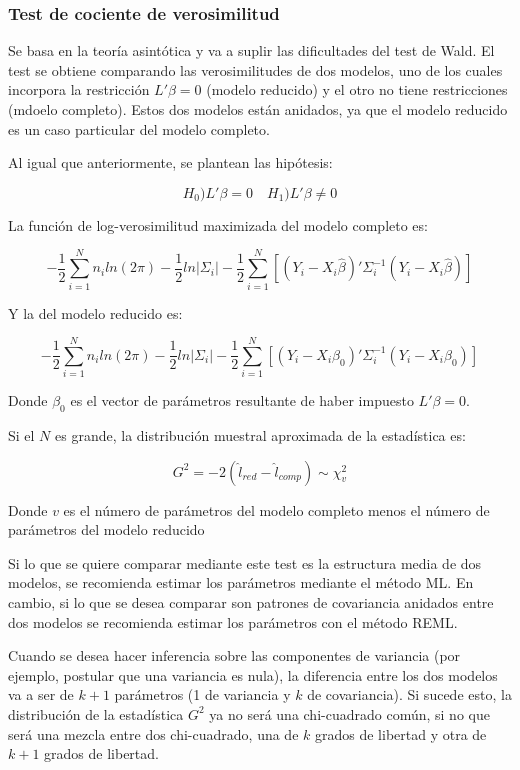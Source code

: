 \documentclass[12pt]{article}
\begin{document}
\subsubsection{Test de cociente de verosimilitud}

Se basa en la teoría asintótica y va a suplir las dificultades del test de Wald. El test se obtiene comparando las
verosimilitudes de dos modelos, uno de los cuales incorpora la restricción $L'\beta = 0$ (modelo reducido) y el otro no
tiene restricciones (mdoelo completo). Estos dos modelos están anidados, ya que el modelo reducido es un caso particular
del modelo completo.

Al igual que anteriormente, se plantean las hipótesis:

\[ H_0) L'\beta = 0 \quad H_1) L'\beta \neq 0 \]

La función de log-verosimilitud maximizada del modelo completo es:

\[ -\frac{1}{2} \sum_{i=1}^{N}n_i ln(2\pi) - \frac{1}{2}ln|\varSigma_i| -
\frac{1}{2} \sum_{i=1}^{N} [(Y_i - X_i\hat{\beta})' \varSigma_i^{-1} (Y_i - X_i\hat{\beta})] \]

Y la del modelo reducido es:

\[ -\frac{1}{2} \sum_{i=1}^{N}n_i ln(2\pi) - \frac{1}{2}ln|\varSigma_i| -
\frac{1}{2} \sum_{i=1}^{N} [(Y_i - X_i\beta_0)' \varSigma_i^{-1} (Y_i - X_i\beta_0)] \]

Donde $\beta_0$ es el vector de parámetros resultante de haber impuesto $L'\beta = 0$.

Si el $N$ es grande, la distribución muestral aproximada de la estadística es:

\[ G^2 = -2 (\hat{l}_{red} - \hat{l}_{comp}) \sim \chi_v^2 \]

Donde $v$ es el número de parámetros del modelo completo menos el número de parámetros del modelo reducido

Si lo que se quiere comparar mediante este test es la estructura media de dos modelos, se recomienda estimar los parámetros
mediante el método ML. En cambio, si lo que se desea comparar son patrones de covariancia anidados entre dos modelos se
recomienda estimar los parámetros con el método REML.

Cuando se desea hacer inferencia sobre las componentes de variancia (por ejemplo, postular que una variancia es nula),
la diferencia entre los dos modelos va a ser de $k+1$ parámetros (1 de variancia y $k$ de covariancia). Si sucede esto,
la distribución de la estadística $G^2$ ya no será una chi-cuadrado común, si no que será una mezcla entre dos chi-cuadrado,
una de $k$ grados de libertad y otra de $k+1$ grados de libertad.
\end{document}

